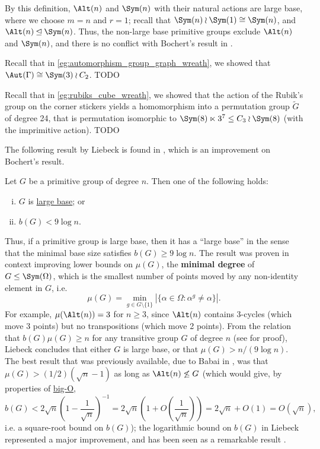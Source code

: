 By this definition, $\Alt(n)$ and $\Sym(n)$ with their natural actions are large base, where we choose $m = n$ and $r = 1$; recall that $\Sym(n) \wr \Sym(1) \cong \Sym(n)$, and $\Alt(n) \unlhd \Sym(n)$. Thus, the non-large base primitive groups exclude $\Alt(n)$ and $\Sym(n)$, and there is no conflict with Bochert's result in \cite{bochert1889}.

\begin{example}\label{eg:automorphism_group_graph_large_base}
    Recall that in \autoref{eg:automorphism_group_graph_wreath}, we showed that $\Aut(\Gamma) \cong \Sym(3) \wr C_2$. TODO
\end{example}

\begin{example}\label{eg:rubiks_group_large_base}
    Recall that in \autoref{eg:rubiks_cube_wreath}, we showed that the action of the Rubik's group on the corner stickers yields a homomorphism into a permutation group $\tilde G$ of degree 24, that is permutation isomorphic to $\Sym(8) \ltimes 3^7 \leq C_3 \wr \Sym(8)$ (with the imprimitive action). TODO
\end{example}

The following result by Liebeck is found in \cite{liebeck1984}, which is an improvement on Bochert's result.

\begin{theorem}[Liebeck, 1984]\label{thm:liebeck1984}
    Let $G$ be a primitive group of degree $n$. Then one of the following holds:
    \begin{enumerate}[(i)]
        \item $G$ is \hyperref[def:large_base]{large base}; or
        \item $b(G) < 9\log n$.
    \end{enumerate}
\end{theorem}

Thus, if a primitive group is large base, then it has a ``large base'' in the sense that the minimal base size satisfies $b(G) \geq 9\log n$. The result was proven in context improving lower bounds on $\mu(G)$, the \textbf{minimal degree} of $G \leq \Sym(\Omega)$, which is the smallest number of points moved by any non-identity element in $G$, i.e.
$$\mu(G) = \min_{g \in G \setminus \{1\}}|\{\alpha \in \Omega : \alpha^g \neq \alpha\}|.$$
For example, $\mu(\Alt(n)) = 3$ for $n \geq 3$, since $\Alt(n)$ contains 3-cycles (which move 3 points) but no transpositions (which move 2 points). From the relation that $b(G)\mu(G) \geq n$ for any transitive group $G$ of degree $n$ (see \cite{cameron1984} for proof), Liebeck concludes that either $G$ is large base, or that $\mu(G) > n/(9 \log n)$. The best result that was previously available, due to Babai in \cite{babai1981}, was that $\mu(G) > (1/2)(\sqrt{n} - 1)$ as long as $\Alt(n) \not\leq G$ (which would give, by properties of \hyperref[def:big_O_notation]{big-O},
$$b(G) < 2\sqrt{n}\left(1 - \frac{1}{\sqrt{n}}\right)^{-1} = 2\sqrt{n}\left(1 + O\left(\frac{1}{\sqrt{n}}\right)\right) = 2\sqrt{n} + O(1) = O(\sqrt{n}),$$
i.e. a square-root bound on $b(G)$); the logarithmic bound on $b(G)$ in Liebeck represented a major improvement, and has been seen as a remarkable result \cite{moscatiello_roney-dougal2021}.

